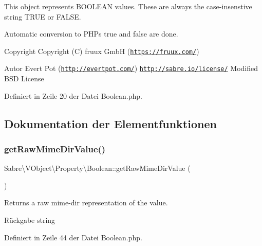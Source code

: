 This object represents B\+O\+O\+L\+E\+AN values. These are always the case-\/insenstive string T\+R\+UE or F\+A\+L\+SE.

Automatic conversion to P\+HP\textquotesingle{}s true and false are done.

\begin{DoxyCopyright}{Copyright}
Copyright (C) fruux GmbH (\href{https://fruux.com/}{\tt https\+://fruux.\+com/}) 
\end{DoxyCopyright}
\begin{DoxyAuthor}{Autor}
Evert Pot (\href{http://evertpot.com/}{\tt http\+://evertpot.\+com/})  \href{http://sabre.io/license/}{\tt http\+://sabre.\+io/license/} Modified B\+SD License 
\end{DoxyAuthor}


Definiert in Zeile 20 der Datei Boolean.\+php.



\subsection{Dokumentation der Elementfunktionen}
\mbox{\label{class_sabre_1_1_v_object_1_1_property_1_1_boolean_a11aea847dcdc2ae091fbfea4dcde7e68}} 
\subsubsection{\texorpdfstring{get\+Raw\+Mime\+Dir\+Value()}{getRawMimeDirValue()}}
{\footnotesize\ttfamily Sabre\textbackslash{}\+V\+Object\textbackslash{}\+Property\textbackslash{}\+Boolean\+::get\+Raw\+Mime\+Dir\+Value (\begin{DoxyParamCaption}{ }\end{DoxyParamCaption})}

Returns a raw mime-\/dir representation of the value.

\begin{DoxyReturn}{Rückgabe}
string 
\end{DoxyReturn}


Definiert in Zeile 44 der Datei Boolean.\+php.

\mbox{\label{class_sabre_1_1_v_object_1_1_property_1_1_boolean_ae79d5ed76299c11d0d19661e640a8e91}} 
